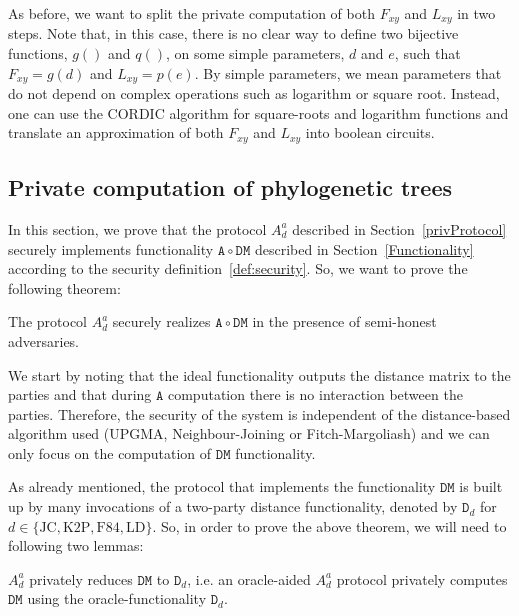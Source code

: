 As before, we want to split the private computation of both $F_{xy}$ and $L_{xy}$ in two steps. Note that, in this case, there is no clear way to define two bijective functions, $g()$ and $q()$, on some simple parameters, $d$ and $e$, such that $F_{xy} = g(d)$ and $L_{xy} = p(e)$. By simple parameters, we mean parameters that do not depend on complex operations such as logarithm or square root. Instead, one can use the CORDIC algorithm \cite{V59, Songhori2019} for square-roots and logarithm functions and translate an approximation of both $F_{xy}$ and $L_{xy}$ into boolean circuits.



\subsection{Private computation of phylogenetic trees}

In this section, we prove that the protocol $A^a_d$ described in Section~\ref{privProtocol} securely implements functionality $\mathtt{A}\circ \mathtt{DM}$ described in Section~\ref{Functionality} according to the security definition~\ref{def:security}. So, we want to prove the following theorem:

\begin{theorem}
The protocol $A^a_d$ securely realizes $\mathtt{A}\circ \mathtt{DM}$ in the presence of semi-honest adversaries.
\end{theorem}

We start by noting that the ideal functionality outputs the distance matrix to the parties and that during $\mathtt{A}$ computation there is no interaction between the parties. Therefore, the security of the system is independent of the distance-based algorithm used (UPGMA, Neighbour-Joining or Fitch-Margoliash) and we can only focus on the computation of $\mathtt{DM}$ functionality.

As already mentioned, the protocol that implements the functionality $\mathtt{DM}$ is built up by many invocations of a two-party distance functionality, denoted by $\mathtt{D}_d$ for $d\in\{\text{JC}, \text{K2P}, \text{F84}, \text{LD}\}$. So, in order to prove the above theorem, we will need to following two lemmas:

\begin{lemma}\label{firstlemma}
$A^a_d$ privately reduces $\mathtt{DM}$ to $\mathtt{D}_d$, i.e. an oracle-aided $A^a_d$ protocol privately computes $\mathtt{DM}$ using the oracle-functionality $\mathtt{D}_d$.
\end{lemma}

